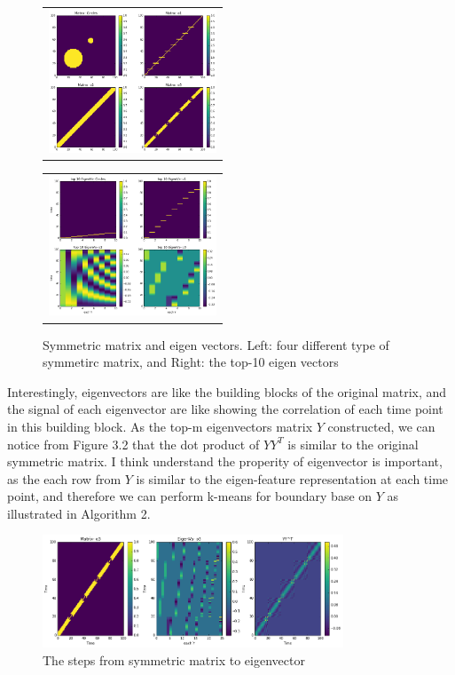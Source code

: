 \documentclass[final]{siamltexmm}
\begin{document}
\begin{figure}[H]
\centering
\begin{subfigure}
  \begin{tabular}{c}
  \includegraphics[width=50mm]{./figure/similarityMatrix.png}
  \end{tabular}{}
\end{subfigure}
  \begin{tabular}{c}
  \includegraphics[width=50mm]{./figure/similarityMatrix_eigens.png}
  \end{tabular}{}
\begin{subfigure}
\end{subfigure}
\caption{Symmetric matrix and eigen vectors. Left: four different type of symmetirc matrix, and Right: the top-10 eigen vectors}
\end{figure}
Interestingly, eigenvectors are like the building blocks of the original matrix, and the signal of each eigenvector are like showing the correlation of each time point in this building block. As the top-m eigenvectors matrix $Y$ constructed, we can notice from Figure 3.2 that the dot product of $YY^T$ is similar to the original symmetric matrix. I think understand the properity of eigenvector is important, as the each row from $Y$ is similar to the eigen-feature representation at each time point, and therefore we can perform k-means for boundary base on $Y$ as illustrated in Algorithm 2.
\begin{figure}[H]
  \centering
    \includegraphics[width=0.8\textwidth]{./figure/o3_eachStage.png}
  \caption{The steps from symmetric matrix to eigenvector}
\end{figure}
\end{document}
